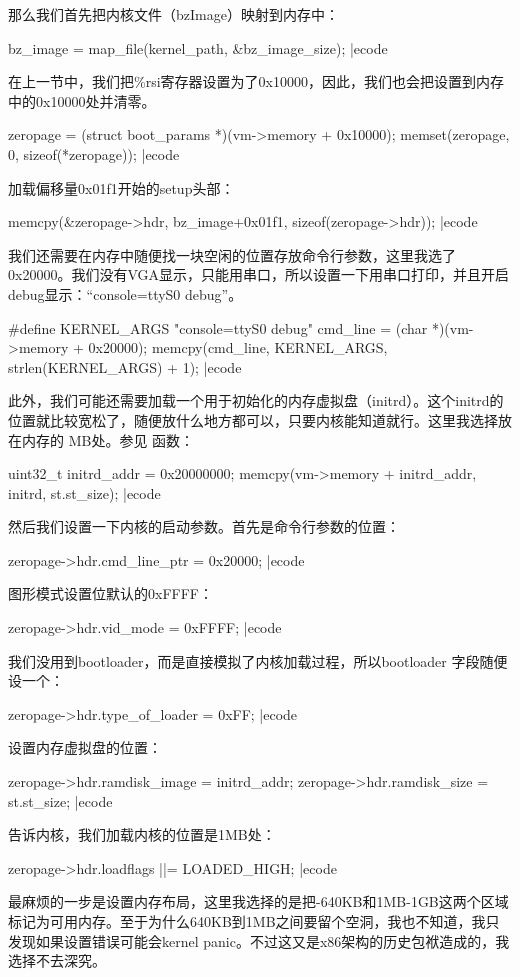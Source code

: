 那么我们首先把内核文件（bzImage）映射到内存中：

\bcode
bz_image = map_file(kernel_path, &bz_image_size);
|ecode

在上一节中，我们把\sp \%rsi\sp 寄存器设置为了\sp 0x10000，因此，我们也会把\sp 设置到内存中的\sp 0x10000\sp 处并清零。

\bcode
zeropage = (struct boot_params *)(vm->memory + 0x10000);
memset(zeropage, 0, sizeof(*zeropage));
|ecode

加载偏移量\sp 0x01f1\sp 开始的\sp setup\sp 头部：

\bcode
memcpy(&zeropage->hdr, bz_image+0x01f1, sizeof(zeropage->hdr));
|ecode

我们还需要在内存中随便找一块空闲的位置存放命令行参数，这里我选了\sp 0x20000。我们没有VGA显示，只能用串口，所以设置一下用串口打印，并且开启debug显示：“console=ttyS0 debug”。

\bcode
#define KERNEL_ARGS "console=ttyS0 debug"
cmd_line = (char *)(vm->memory + 0x20000);
memcpy(cmd_line, KERNEL_ARGS, strlen(KERNEL_ARGS) + 1);
|ecode

此外，我们可能还需要加载一个用于初始化的内存虚拟盘（initrd）。这个\sp initrd\sp 的位置就比较宽松了，随便放什么地方都可以，只要内核能知道就行。这里我选择放在内存的 MB\sp 处。参见 函数：

\bcode
uint32_t initrd_addr = 0x20000000;
memcpy(vm->memory + initrd_addr, initrd, st.st_size);
|ecode

然后我们设置一下内核的启动参数。首先是命令行参数的位置：

\bcode
zeropage->hdr.cmd_line_ptr = 0x20000;
|ecode

图形模式设置位默认的\sp 0xFFFF：

\bcode
zeropage->hdr.vid_mode = 0xFFFF;
|ecode

我们没用到\sp bootloader，而是直接模拟了内核加载过程，所以\sp bootloader 字段随便设一个：

\bcode
zeropage->hdr.type_of_loader = 0xFF;
|ecode

设置内存虚拟盘的位置：

\bcode
zeropage->hdr.ramdisk_image = initrd_addr;
zeropage->hdr.ramdisk_size = st.st_size;
|ecode

告诉内核，我们加载内核的位置是\sp 1MB\sp 处：

\bcode
zeropage->hdr.loadflags ||= LOADED_HIGH;
|ecode

最麻烦的一步是设置内存布局，这里我选择的是把-640KB\sp 和\sp 1MB-1GB\sp 这两个区域标记为可用内存。至于为什么\sp 640KB\sp 到\sp 1MB\sp 之间要留个空洞，我也不知道，我只发现如果设置错误可能会\sp kernel panic。不过这又是\sp x86\sp 架构的历史包袱造成的，我选择不去深究。

